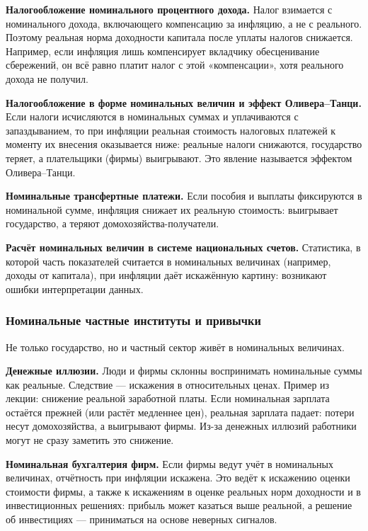 \documentclass[11pt,a4paper]{article}
\begin{document}
\textbf{Налогообложение номинального процентного дохода.} Налог взимается с номинального дохода, включающего компенсацию за инфляцию, а не с реального. Поэтому реальная норма доходности капитала после уплаты налогов снижается. Например, если инфляция лишь компенсирует вкладчику обесценивание сбережений, он всё равно платит налог с этой «компенсации», хотя реального дохода не получил.

\textbf{Налогообложение в форме номинальных величин и эффект Оливера--Танци.} Если налоги исчисляются в номинальных суммах и уплачиваются с запаздыванием, то при инфляции реальная стоимость налоговых платежей к моменту их внесения оказывается ниже: реальные налоги снижаются, государство теряет, а плательщики (фирмы) выигрывают. Это явление называется эффектом Оливера--Танци.

\textbf{Номинальные трансфертные платежи.} Если пособия и выплаты фиксируются в номинальной сумме, инфляция снижает их реальную стоимость: выигрывает государство, а теряют домохозяйства-получатели.

\textbf{Расчёт номинальных величин в системе национальных счетов.} Статистика, в которой часть показателей считается в номинальных величинах (например, доходы от капитала), при инфляции даёт искажённую картину: возникают ошибки интерпретации данных.

\subsubsection{Номинальные частные институты и привычки}

Не только государство, но и частный сектор живёт в номинальных величинах.

\textbf{Денежные иллюзии.} Люди и фирмы склонны воспринимать номинальные суммы как реальные. Следствие --- искажения в относительных ценах. Пример из лекции: снижение реальной заработной платы. Если номинальная зарплата остаётся прежней (или растёт медленнее цен), реальная зарплата падает: потери несут домохозяйства, а выигрывают фирмы. Из-за денежных иллюзий работники могут не сразу заметить это снижение.

\textbf{Номинальная бухгалтерия фирм.} Если фирмы ведут учёт в номинальных величинах, отчётность при инфляции искажена. Это ведёт к искажению оценки стоимости фирмы, а также к искажениям в оценке реальных норм доходности и в инвестиционных решениях: прибыль может казаться выше реальной, а решение об инвестициях --- приниматься на основе неверных сигналов.
\end{document}
